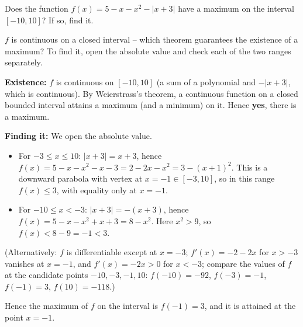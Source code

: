 
\begin{question}
Does the function $f(x)=5-x-x^2-|x+3|$ have a maximum on the interval $[-10,10]$? If so, find it.
\end{question}

\begin{hint}
$f$ is continuous on a closed interval -- which theorem guarantees the existence of a maximum? To find it, open the absolute value and check each of the two ranges separately.
\end{hint}

\begin{solution}
\textbf{Existence:} $f$ is continuous on $[-10,10]$ (a sum of a polynomial and $-|x+3|$, which is continuous). By Weierstrass's theorem, a continuous function on a closed bounded interval attains a maximum (and a minimum) on it. Hence \textbf{yes}, there is a maximum.

\textbf{Finding it:} We open the absolute value.
\begin{itemize}
  \item For $-3\le x\le10$: $|x+3|=x+3$, hence $f(x)=5-x-x^2-x-3=2-2x-x^2=3-(x+1)^2$. This is a downward parabola with vertex at $x=-1\in[-3,10]$, so in this range $f(x)\le3$, with equality only at $x=-1$.
  \item For $-10\le x<-3$: $|x+3|=-(x+3)$, hence $f(x)=5-x-x^2+x+3=8-x^2$. Here $x^2>9$, so $f(x)<8-9=-1<3$.
\end{itemize}
(Alternatively: $f$ is differentiable except at $x=-3$; $f'(x)=-2-2x$ for $x>-3$ vanishes at $x=-1$, and $f'(x)=-2x>0$ for $x<-3$; compare the values of $f$ at the candidate points $-10,-3,-1,10$: $f(-10)=-92$, $f(-3)=-1$, $f(-1)=3$, $f(10)=-118$.)

Hence the maximum of $f$ on the interval is $\boxed{f(-1)=3}$, and it is attained at the point $x=-1$.
\end{solution}
